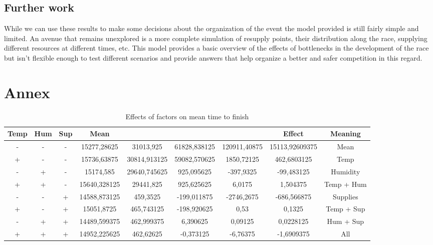 \documentclass[conference]{IEEEtran}
\begin{document}
\subsection{Further work}

While we can use these results to make some decisions about the organization of the event the model provided is still fairly simple and limited. An avenue that remains unexplored is a more complete simulation of resupply points, their distribution along the race, supplying different resources at different times, etc. This model provides a basic overview of the effects of bottlenecks in the development of the race but isn't flexible enough to test different scenarios and provide answers that help organize a better and safer competition in this regard.

\newpage
\onecolumn
\section{Annex}

\begin{table}[h]
\caption{Effects of factors on mean time to finish}
\begin{center}
\begin{tabular}{|c|c|c|c|c|c|c|c|c|}
\hline
\textbf{Temp}&\textbf{Hum}&\textbf{Sup}&\textbf{Mean}&&&&\textbf{Effect}&\textbf{Meaning} \\
\hline
-&-&-&15277,28625&31013,925&61828,838125&120911,40875&15113,92609375&Mean \\
+&-&-&15736,63875&30814,913125&59082,570625&1850,72125&462,6803125&Temp \\
-&+&-&15174,585&29640,745625&925,095625&-397,9325&-99,483125&Humidity \\
+&+&-&15640,328125&29441,825&925,625625&6,0175&1,504375&Temp + Hum \\
-&-&+&14588,873125&459,3525&-199,011875&-2746,2675&-686,566875&Supplies \\
+&-&+&15051,8725&465,743125&-198,920625&0,53&0,1325&Temp + Sup \\ 
-&+&+&14489,599375&462,999375&6,390625&0,09125&0,0228125&Hum + Sup \\
+&+&+&14952,225625&462,62625&-0,373125&-6,76375&-1,6909375&All \\
\hline
\end{tabular}
\label{tab:rep_significance_2}
\end{center}
\end{table}
\end{document}
